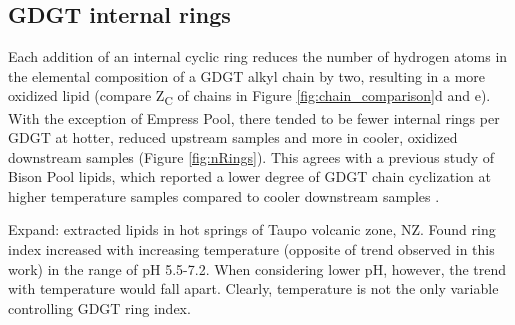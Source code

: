 

\subsection{GDGT internal rings} Each addition of an internal cyclic ring reduces the number of hydrogen atoms in the elemental composition of a GDGT alkyl chain by two, resulting in a more oxidized lipid (compare Z\textsubscript{C} of chains in Figure \ref{fig:chain_comparison}d and e). With the exception of Empress Pool, there tended to be fewer internal rings per GDGT at hotter,  reduced upstream samples and more in cooler, oxidized downstream samples (Figure \ref{fig:nRings}). This agrees with a previous study of Bison Pool lipids, which reported a lower degree of GDGT chain cyclization at higher temperature samples compared to cooler downstream samples \citep{schubotz2013spatial}.

Expand:
\cite{kaur2015temperature} extracted lipids in hot springs of Taupo volcanic zone, NZ. Found ring index increased with increasing temperature (opposite of trend observed in this work) in the range of pH 5.5-7.2. When considering lower pH, however, the trend with temperature would fall apart. Clearly, temperature is not the only variable controlling GDGT ring index.




